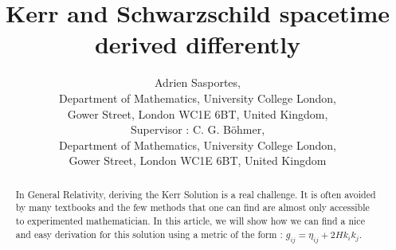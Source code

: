 \documentclass[a4paper,12pt]{article}
\title{Kerr and Schwarzschild spacetime derived differently}
\author{Adrien Sasportes,\\
Department of Mathematics, University College London, \\
Gower Street, London WC1E 6BT, United Kingdom,
\\ Supervisor : C. G. B\"ohmer,\\
Department of Mathematics, University College London, \\
Gower Street, London WC1E 6BT, United Kingdom
}
\theoremstyle{definition}
\begin{document}
\pagestyle{headings}
\begin{titlepage}
\clearpage\maketitle
\begin{abstract}
	In General Relativity, deriving the Kerr Solution is a real challenge.
	It is often avoided by many textbooks and the few methods that one can find are almost only accessible to experimented mathematician.
	In this article, we will show how we can find a nice and easy derivation for this solution using a metric of the form : $g_{ij}=\eta_{ij}+2Hk_ik_j$.
\end{abstract}
\thispagestyle{empty}
\pagebreak
\clearpage\mbox{}\thispagestyle{empty}\clearpage
\clearpage\tableofcontents
\thispagestyle{empty}
\pagebreak
\clearpage\mbox{}\thispagestyle{empty}\clearpage
{}

\end{titlepage}
\newtheorem{definition}{Definition}

\end{document}
